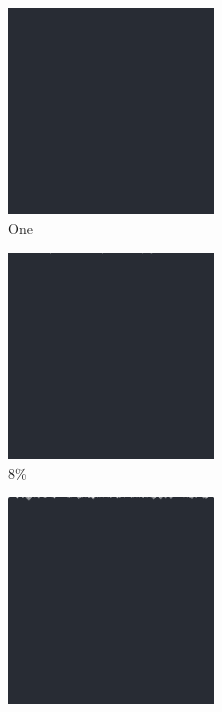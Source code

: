 \documentclass[12pt, fleqn]{report}                             %
\theoremstyle{break}                                            %
\begin{document}
      \begin{figure}[ht!]
        \centering
        \begin{subfigure}[b]{0.4\linewidth}
          \includegraphics[width=0.6\textwidth]{Images/160/a.png}
          \caption{One}
        \end{subfigure}
        \begin{subfigure}[b]{0.4\linewidth}
          \includegraphics[width=0.6\textwidth]{Images/160/b.png}
          \caption{8\%}
        \end{subfigure}
        \begin{subfigure}[b]{0.4\linewidth}
          \includegraphics[width=0.6\textwidth]{Images/160/c.png}

\end{subfigure}
\end{figure}
\end{document}

